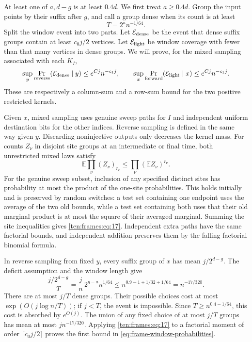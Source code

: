 At least one of $a,d-g$ is at least $0.4d$. We first treat $a\ge0.4d$. Group the input points by their suffix after $g$, and call a group dense when its count is at least
\[
 T=2^a n^{-1/64}.
\]
Split the window event into two parts. Let $\mathcal E_{\rm dense}$ be the event that dense suffix groups contain at least $c_0j/2$ vertices. Let $\mathcal E_{\rm light}$ be window coverage with fewer than that many vertices in dense groups. We will prove, for the mixed sampling associated with each $K_I$,
\begin{equation}\label{eq:frame-window-probabilities}
 \sup_y\Pr_{\rm reverse}(\mathcal E_{\rm dense}\mid y)
 \le e^{Cj}n^{-c_1j},\qquad
 \sup_x\Pr_{\rm forward}(\mathcal E_{\rm light}\mid x)
 \le e^{Cj}n^{-c_1j}.
\end{equation}
These are respectively a column-sum and a row-sum bound for the two positive restricted kernels.

Given $x$, mixed sampling uses genuine sweep paths for $I$ and independent uniform destination bits for the other indices. Reverse sampling is defined in the same way given $y$. Discarding noninjective outputs only decreases the kernel mass. For counts $Z_\nu$ in disjoint site groups at an intermediate or final time, both unrestricted mixed laws satisfy
\begin{equation}
 \mathbb E\prod_\nu(Z_\nu)_{r_\nu}
 \le\prod_\nu(\mathbb E Z_\nu)^{r_\nu}.
 \label{ten:frames:eq:17}
\end{equation}
For the genuine sweep subset, inclusion of any specified distinct sites has probability at most the product of the one-site probabilities. This holds initially and is preserved by random switches: a test set containing one endpoint uses the average of the two old bounds, while a test set containing both uses that their old marginal product is at most the square of their averaged marginal. Summing the site inequalities gives \eqref{ten:frames:eq:17}. Independent extra paths have the same factorial bounds, and independent addition preserves them by the falling-factorial binomial formula.

In reverse sampling from fixed $y$, every suffix group of $x$ has mean $j/2^{d-g}$. The deficit assumption and the window length give
\[
 \frac{j/2^{d-g}}{T}
 =\frac{j}{n}\,2^{g-a}n^{1/64}
 \le n^{0.9-1+1/32+1/64}=n^{-17/320}.
\]
There are at most $j/T$ dense groups. Their possible choices cost at most $\exp(O(j\log n/T))$; if $j<T$, the event is impossible. Since $T\ge n^{0.4-1/64}$, this cost is absorbed by $e^{O(j)}$. The union of any fixed choice of at most $j/T$ groups has mean at most $j n^{-17/320}$. Applying \eqref{ten:frames:eq:17} to a factorial moment of order $\lceil c_0j/2\rceil$ proves the first bound in \eqref{eq:frame-window-probabilities}.

